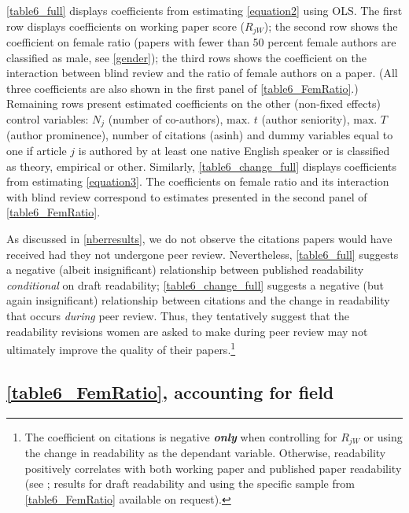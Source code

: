 \begin{appendices}
\begin{refsection}
\autoref{table6_full} displays coefficients from estimating \autoref{equation2} using OLS. The first row displays coefficients on working paper score ($R_{jW}$); the second row shows the coefficient on female ratio (papers with fewer than 50 percent female authors are classified as male, see \autoref{gender}); the third rows shows the coefficient on the interaction between blind review and the ratio of female authors on a paper. (All three coefficients are also shown in the first panel of \autoref{table6_FemRatio}.) Remaining rows present estimated coefficients on the other (non-fixed effects) control variables: $N_j$ (number of co-authors), $\text{max. }t$ (author seniority), $\text{max. }T$ (author prominence), number of citations (asinh) and dummy variables equal to one if article $j$ is authored by at least one native English speaker or is classified as theory, empirical or other. Similarly, \autoref{table6_change_full} displays coefficients from estimating \autoref{equation3}. The coefficients on female ratio and its interaction with blind review correspond to estimates presented in the second panel of \autoref{table6_FemRatio}.

As discussed in \autoref{nberresults}, we do not observe the citations papers would have received had they not undergone peer review. Nevertheless, \autoref{table6_full} suggests a negative (albeit insignificant) relationship between published readability \emph{conditional} on draft readability; \autoref{table6_change_full} suggests a negative (but again insignificant) relationship between citations and the change in readability that occurs \emph{during} peer review. Thus, they tentatively suggest that the readability revisions women are asked to make during peer review may not ultimately improve the quality of their papers.\footnote{The coefficient on citations is negative \textbf{\emph{only}} when controlling for $R_{jW}$ or using the change in readability as the dependant variable. Otherwise, readability positively correlates with both working paper and published paper readability (see ; results for draft readability and using the specific sample from \autoref{table6_FemRatio} available on request).}




\clearpage


\subsection{\autoref{table6_FemRatio}, accounting for field}
\label{appendixnberfield}


\end{refsection}
\end{appendices}
